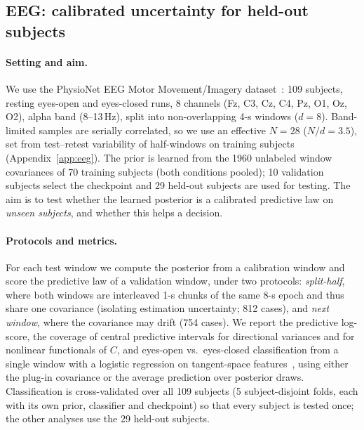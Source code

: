 \subsection{EEG: calibrated uncertainty for held-out subjects}
\label{sec:exp-eeg}

\paragraph{Setting and aim.}
We use the PhysioNet EEG Motor Movement/Imagery dataset~\citep{goldberger2000physionet,schalk2004bci2000}: 109 subjects, resting eyes-open and eyes-closed runs, 8 channels (Fz, C3, Cz, C4, Pz, O1, Oz, O2), alpha band (8--13\,Hz), split into non-overlapping 4-s windows ($d{=}8$).
Band-limited samples are serially correlated, so we use an effective $N{=}28$ ($N/d{=}3.5$), set from test--retest variability of half-windows on training subjects (Appendix~\ref{app:eeg}).
The prior is learned from the 1960 unlabeled window covariances of 70 training subjects (both conditions pooled); 10 validation subjects select the checkpoint and 29 held-out subjects are used for testing.
The aim is to test whether the learned posterior is a calibrated predictive law on \emph{unseen subjects}, and whether this helps a decision.

\paragraph{Protocols and metrics.}
For each test window we compute the posterior from a calibration window and score the predictive law of a validation window, under two protocols: \emph{split-half}, where both windows are interleaved 1-s chunks of the same 8-s epoch and thus share one covariance (isolating estimation uncertainty; 812 cases), and \emph{next window}, where the covariance may drift (754 cases).
We report the predictive log-score, the coverage of central predictive intervals for directional variances and for nonlinear functionals of $C$, and eyes-open vs.\ eyes-closed classification from a single window with a logistic regression on tangent-space features~\citep{barachant2012multiclass}, using either the plug-in covariance or the average prediction over posterior draws.
Classification is cross-validated over all 109 subjects (5 subject-disjoint folds, each with its own prior, classifier and checkpoint) so that every subject is tested once; the other analyses use the 29 held-out subjects.

